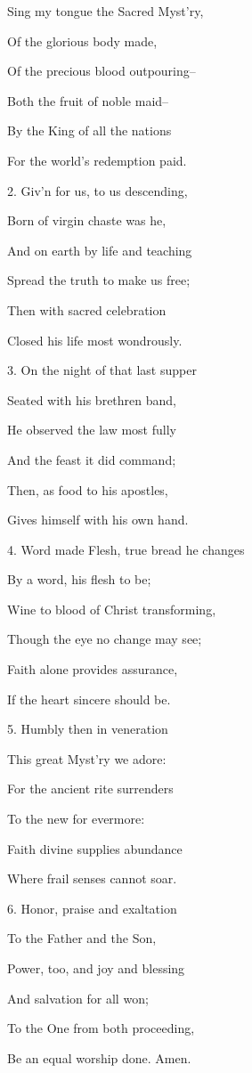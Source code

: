 Sing my tongue the Sacred Myst'ry,

\noindent Of the glorious body made,

\noindent Of the precious blood outpouring--

\noindent Both the fruit of noble maid--

\noindent By the King of all the nations

\noindent For the world's redemption paid.

\noindent 

2. Giv'n for us, to us descending,

\noindent Born of virgin chaste was he,

\noindent And on earth by life and teaching

\noindent Spread the truth to make us free;

\noindent Then with sacred celebration

\noindent Closed his life most wondrously.

\noindent 

3. On the night of that last supper

\noindent Seated with his brethren band,

\noindent He observed the law most fully

\noindent And the feast it did command;

\noindent Then, as food to his apostles,

\noindent Gives himself with his own hand.

\noindent 

4. Word made Flesh, true bread he changes

\noindent By a word, his flesh to be;

\noindent Wine to blood of Christ transforming,

\noindent Though the eye no change may see;

\noindent Faith alone provides assurance,

\noindent If the heart sincere should be.

\noindent 

5. Humbly then in veneration

\noindent This great Myst'ry we adore:

\noindent For the ancient rite surrenders

\noindent To the new for evermore:

\noindent Faith divine supplies abundance

\noindent Where frail senses cannot soar.

\noindent 

6. Honor, praise and exaltation

\noindent To the Father and the Son,

\noindent Power, too, and joy and blessing

\noindent And salvation for all won;

\noindent To the One from both proceeding,

\noindent Be an equal worship done. Amen.